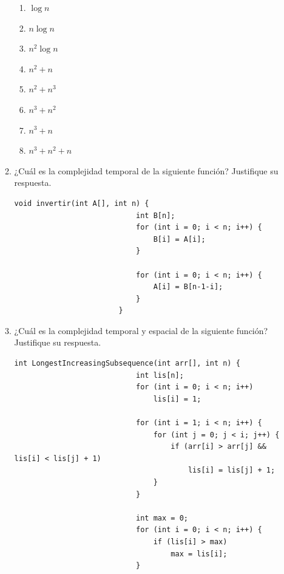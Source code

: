 \documentclass[12pt]{article}
\begin{document}
\begin{titlepage}
\begin{enumerate}
\begin{enumerate}[label*=\arabic*.]
\begin{multicols}{3}
\begin{enumerate}
                    \item $\log n$
                    \item $n \log n$
                    \item $n^2 \log n$
                    \item $n^2 + n$
                    \item $n^2 + n^3$
                    \item $n^3 + n^2$
                    \item $n^3 + n$
                    \item $n^3 + n^2 + n$
                \end{enumerate}
                \end{multicols}
                \newpage
                \item ¿Cuál es la complejidad temporal de la siguiente función? Justifique su respuesta.
                    \begin{lstlisting}[xleftmargin=-14.4em]
                        void invertir(int A[], int n) {
                            int B[n];
                            for (int i = 0; i < n; i++) {
                                B[i] = A[i];
                            }

                            for (int i = 0; i < n; i++) {
                                A[i] = B[n-1-i];
                            }
                        }
                    \end{lstlisting}
                \item ¿Cuál es la complejidad temporal y espacial de la siguiente función? Justifique su respuesta.
                    \begin{lstlisting}[xleftmargin=-14.4em]
                        int LongestIncreasingSubsequence(int arr[], int n) {
                            int lis[n];
                            for (int i = 0; i < n; i++)
                                lis[i] = 1;
                        
                            for (int i = 1; i < n; i++) {
                                for (int j = 0; j < i; j++) {
                                    if (arr[i] > arr[j] && lis[i] < lis[j] + 1)
                                        lis[i] = lis[j] + 1;
                                }
                            }
                        
                            int max = 0;
                            for (int i = 0; i < n; i++) {
                                if (lis[i] > max)
                                    max = lis[i];
                            }
                        

\end{lstlisting}
\end{enumerate}
\end{enumerate}
\end{titlepage}
\end{document}
